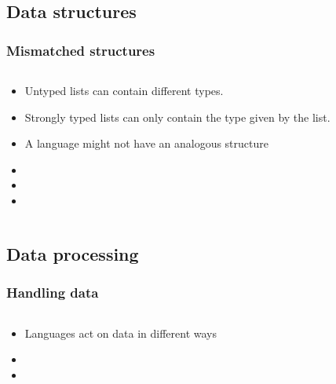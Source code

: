 \documentclass{beamer}
\begin{document}
\subsection{Data structures}
\begin{frame}
  \frametitle{Mismatched structures}
  
  \begin{columns}
  \begin{column}{0.6\textwidth}
  \begin{itemize}
  	\item Untyped lists can contain different types.
  	\item Strongly typed lists can only contain the type given by the list.
	\item A language might not have an analogous structure %
	\item 
	\item 
	\item 
  \end{itemize}
  \end{column}
  
  \begin{column}{0.5\textwidth}
  
  \end{column}
  \end{columns}
\end{frame}

\subsection{Data processing}
\begin{frame}
  \frametitle{Handling data}
  
  \begin{columns}
  \begin{column}{0.5\textwidth}
  \begin{itemize}
  \item Languages act on data in different ways %
  \item
  \item
  \end{itemize}
  \end{column}
  \end{columns}
\end{frame}
\end{document}
